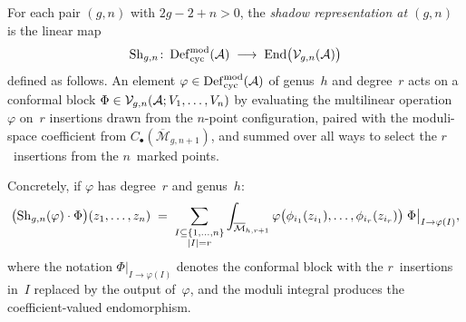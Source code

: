 \begin{definition}
\label{def:thqg-VI-shadow-representation}
For each pair $(g,n)$ with $2g - 2 + n > 0$, the
\emph{shadow representation at $(g,n)$} is the linear map
\begin{equation}%
\Sh_{g,n} \colon
\Defcyc^{\mathrm{mod}}(\cA)
\;\longrightarrow\;
\End\bigl(\cV_{g,n}(\cA)\bigr)
\end{equation}
defined as follows. An element
$\varphi \in \operatorname{Def}_{\mathrm{cyc}}^{\mathrm{mod}}(\mathcal{A})$
of genus~$h$ and degree~$r$ acts on a conformal block
$\Phi \in \mathcal{V}_{g,n}(\mathcal{A}; V_1, \dotsc, V_n)$ by evaluating the
multilinear operation $\varphi$ on~$r$ insertions drawn from the
$n$-point configuration, paired with the moduli-space coefficient
from $C_\bullet(\overline{\mathcal{M}}_{g,n+1})$, and summed over
all ways to select the $r$~insertions from the $n$~marked points.

Concretely, if $\varphi$ has degree~$r$ and genus~$h$:
\begin{equation}%
\bigl(\Sh_{g,n}(\varphi) \cdot \Phi\bigr)(z_1,\dotsc,z_n)
\;=\;
\sum_{\substack{I \subseteq \{1,\dotsc,n\} \\ |I| = r}}
\int_{\overline{\mathcal{M}}_{h,r+1}}
\varphi\bigl(\phi_{i_1}(z_{i_1}),\dotsc,\phi_{i_r}(z_{i_r})\bigr)
\;\Phi\bigl|_{I \to \varphi(I)},
\end{equation}
where the notation $\Phi|_{I \to \varphi(I)}$ denotes the conformal
block with the $r$~insertions in~$I$ replaced by the output
of~$\varphi$, and the moduli integral produces the coefficient-valued
endomorphism.
\end{definition}

